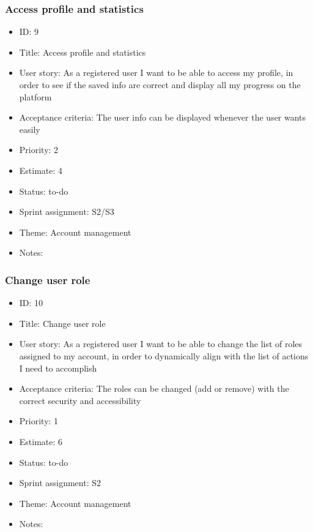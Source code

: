 \subsubsection{Access profile and statistics}
\begin{itemize}
	\item ID: 9
	\item Title: Access profile and statistics
	\item User story: As a registered user I want to be able to access my profile, in order to see if the saved info are correct and display all my progress on the platform
	\item Acceptance criteria: The user info can be displayed whenever the user wants easily
	\item Priority: 2
	\item Estimate: 4
	\item Status: to-do
	\item Sprint assignment: S2/S3
	\item Theme: Account management
	\item Notes:
\end{itemize}

\subsubsection{Change user role}
\begin{itemize}
	\item ID: 10
	\item Title: Change user role
	\item User story: As a registered user I want to be able to change the list of roles assigned to my account, in order to dynamically align with the list of actions I need to accomplish
	\item Acceptance criteria: The roles can be changed (add or remove) with the correct security and accessibility
	\item Priority: 1
	\item Estimate: 6
	\item Status: to-do
	\item Sprint assignment: S2
	\item Theme: Account management
	\item Notes:
\end{itemize}

